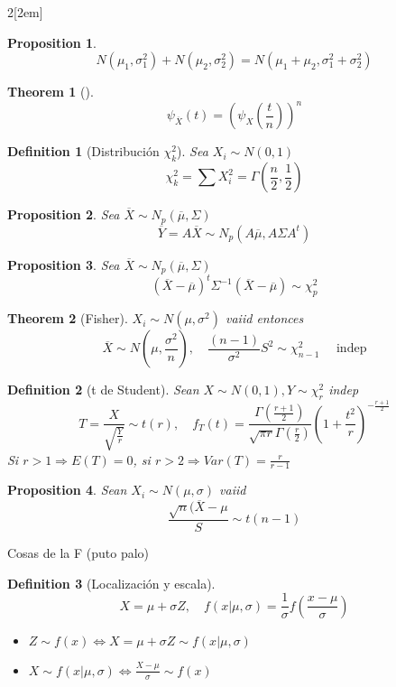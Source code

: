 \documentclass[leqno]{article}
\newtheorem*{theorem}{Theorem}
\newtheorem*{proposition}{Proposition}
\newtheorem*{definition}{Definition}
\begin{document}
\begin{multicols}{2}[\columnsep2em]
\begin{proposition}
\[
N(\mu_1, \sigma_1^2) + N(\mu_2, \sigma _2^2) = N(\mu_1+\mu_2, \sigma_1^2+\sigma _2^2)
\]  
\end{proposition}

\begin{theorem}[]
\[
  \psi _{\overline{X}}(t) = (\psi_X \left( \frac{t}{n} \right) )^n
\] 
\end{theorem}

\begin{definition}[Distribución $\chi_k^2$] Sea $X_i \sim N(0,1)$
\[
\chi_k^2 = \sum X_i^2 = \Gamma\left(\frac{n}{2}, \frac{1}{2}\right)
\] 
\end{definition}

\begin{proposition} Sea $\overline{X} \sim N_p(\overline{\mu}, \Sigma)$ 
  \[
  \overline{Y} = A\overline{X} \sim N_p(A\overline{\mu}, A\Sigma A^t)
  \] 
\end{proposition}

\begin{proposition}Sea $\overline{X}\sim N_p(\overline{\mu}, \Sigma)$ 
  \[
	(\overline{X}-\overline{\mu})^t\Sigma^{-1}(\overline{X}-\overline{\mu})\sim \chi^2_{p}
  \] 
\end{proposition}

\begin{theorem}[Fisher] $X_i \sim  N(\mu, \sigma ^2)$ vaiid entonces
\[
\overline{X} \sim N\left(\mu,\frac{\sigma ^2}{n}\right), \quad \frac{(n-1)}{\sigma ^2}S^2 \sim \chi _{n-1}^2 \quad \text{ indep}
\] 
\end{theorem}

\begin{definition}[t de Student] Sean $X \sim N(0,1), Y\sim \chi _r^2$ indep
\[
T = \frac{X}{\sqrt{\frac{Y}{r}}} \sim t(r), \quad f_T(t) = \frac{\Gamma (\frac{r+1}{2})}{\sqrt{\pi r}\Gamma \left( \frac{r}{2} \right)  } \left( 1+ \frac{t^2}{r} \right)^{-\frac{r+1}{2}}
\] 
Si  $r>1 \Rightarrow E(T)=0$, si $r>2  \Rightarrow Var(T) = \frac{r}{r-1}$
\end{definition}

\begin{proposition}Sean $X_i \sim N(\mu, \sigma )$ vaiid
  \[
  \frac{\sqrt{n} (\overline{X}-\mu}{S} \sim t(n-1)
  \] 
\end{proposition}

Cosas de la F (puto palo)

\begin{definition}[Localización y escala]
\[
  X = \mu + \sigma Z, \quad f(x|\mu, \sigma )= \frac{1}{\sigma }f\left( \frac{x-\mu}{\sigma } \right) 
\]
\begin{itemize}[topsep=-6pt, itemsep=0pt]
  \item $Z \sim f(x) \iff X = \mu + \sigma Z \sim f(x|\mu, \sigma )$
  \item $X\sim f(x|\mu, \sigma ) \iff \frac{X-\mu}{\sigma } \sim  f(x)$
\end{itemize}
\end{definition}


\end{multicols}
\end{document}
